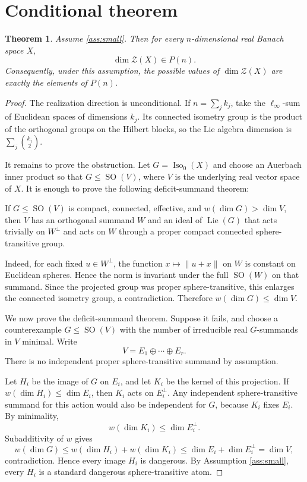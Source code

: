 \documentclass[11pt]{article}
\newtheorem{theorem}{Theorem}
\DeclareMathOperator{\SO}{SO}
\DeclareMathOperator{\Iso}{Iso}
\begin{document}
\section*{Conditional theorem}

\begin{theorem}\label{thm:conditional}
Assume \ref{ass:small}.  Then for every
$n$-dimensional real Banach space $X$,
\[
\dim\mathcal Z(X)\in P(n).
\]
Consequently, under this assumption, the possible values of
$\dim\mathcal Z(X)$ are exactly the elements of $P(n)$.
\end{theorem}

\begin{proof}
The realization direction is unconditional.  If
$n=\sum_j k_j$, take the $\ell_\infty$-sum of Euclidean spaces of dimensions
$k_j$.  Its connected isometry group is the product of the orthogonal groups
on the Hilbert blocks, so the Lie algebra dimension is
$\sum_j \binom{k_j}{2}$.

It remains to prove the obstruction.  Let $G=\Iso_0(X)$ and choose an
Auerbach inner product so that $G\leq \SO(V)$, where $V$ is the underlying
real vector space of $X$.  It is enough to prove the following
deficit-summand theorem:

\medskip
\noindent
If $G\leq \SO(V)$ is compact, connected, effective, and
$w(\dim G)>\dim V$, then $V$ has an orthogonal summand $W$ and an ideal of
$\operatorname{Lie}(G)$ that acts trivially on $W^\perp$ and acts on $W$
through a proper compact connected sphere-transitive group.
\medskip

Indeed, for each fixed $u\in W^\perp$, the function
$x\mapsto \|u+x\|$ on $W$ is constant on Euclidean spheres.  Hence the norm
is invariant under the full $\SO(W)$ on that summand.  Since the projected
group was proper sphere-transitive, this enlarges the connected isometry
group, a contradiction.  Therefore $w(\dim G)\leq \dim V$.

We now prove the deficit-summand theorem.  Suppose it fails, and choose a
counterexample $G\leq \SO(V)$ with the number of irreducible real
$G$-summands in $V$ minimal.  Write
\[
V=E_1\oplus\cdots\oplus E_r.
\]
There is no independent proper sphere-transitive summand by assumption.

Let $H_i$ be the image of $G$ on $E_i$, and let $K_i$ be the kernel of this
projection.  If $w(\dim H_i)\leq \dim E_i$, then $K_i$ acts on
$E_i^\perp$.  Any independent sphere-transitive summand for this action
would also be independent for $G$, because $K_i$ fixes $E_i$.  By
minimality,
\[
w(\dim K_i)\leq \dim E_i^\perp.
\]
Subadditivity of $w$ gives
\[
w(\dim G)
 \leq w(\dim H_i)+w(\dim K_i)
 \leq \dim E_i+\dim E_i^\perp
 =\dim V,
\]
contradiction.  Hence every image $H_i$ is dangerous.  By Assumption
\ref{ass:small}, every $H_i$ is a standard dangerous sphere-transitive atom.


\end{proof}
\end{document}
